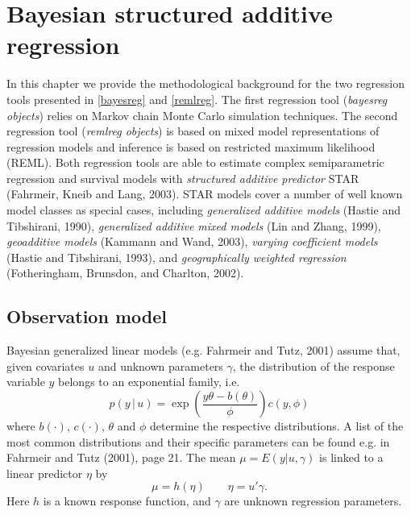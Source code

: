 \chapter{Bayesian structured additive regression}
\label{star}

In this chapter we provide the methodological background for the
two regression tools presented in \autoref{bayesreg} and
\autoref{remlreg}. The first regression tool ({\em bayesreg
objects}) relies on Markov chain Monte Carlo simulation
techniques. The second regression tool ({\em remlreg objects}) is
based on mixed model representations of regression models and
inference is based on restricted maximum likelihood (REML). Both
regression tools are able to estimate complex semiparametric
regression and survival models with {\em structured additive
predictor} STAR (Fahrmeir, Kneib and Lang, 2003). STAR models
cover a number of well known model classes as special cases,
including {\em generalized additive models} (Hastie and
Tibshirani, 1990), {\em generalized additive mixed models} (Lin
and Zhang, 1999), {\em geoadditive models} (Kammann and Wand,
2003), {\em varying coefficient models} (Hastie and Tibshirani,
1993), and {\em geographically weighted regression} (Fotheringham,
Brunsdon, and Charlton, 2002).


\section{Observation model}

Bayesian generalized linear models (e.g. Fahrmeir and Tutz, 2001)
assume that, given covariates $u$ and unknown parameters $\gamma$,
the distribution of the response variable $y$ belongs to an
exponential family, i.e.
\begin{equation}
\label{likel} p(y \, | \, u) = \exp \left( \frac{y \theta -
b(\theta)}{\phi} \right) c(y,\phi)
\end{equation}
where $b(\cdot)$, $c(\cdot)$, $\theta$ and $\phi$ determine the
respective distributions. A list of the most common distributions
and their specific parameters can be found e.g. in Fahrmeir and
Tutz (2001), page 21. The mean $\mu=E(y|u,\gamma)$ is linked to a
linear predictor $\eta$ by
\begin{equation}
\label{glm} \mu=h(\eta) \qquad \eta= u'\gamma.
\end{equation}
Here $h$ is a known response function, and $\gamma$ are unknown
regression parameters.

